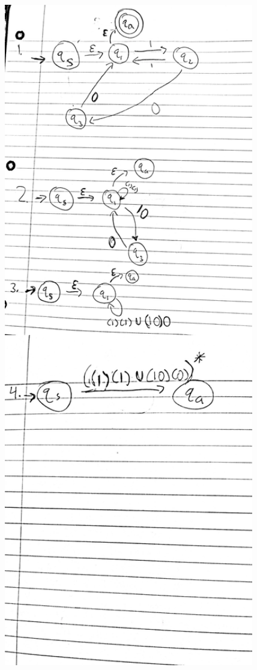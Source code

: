 \documentclass[11pt]{article}
\theoremstyle{definition}
\theoremstyle{theorem}
\begin{document}
\includegraphics[width=15cm, height=30cm]{./p3_images/d2.jpg}
\end{document}
